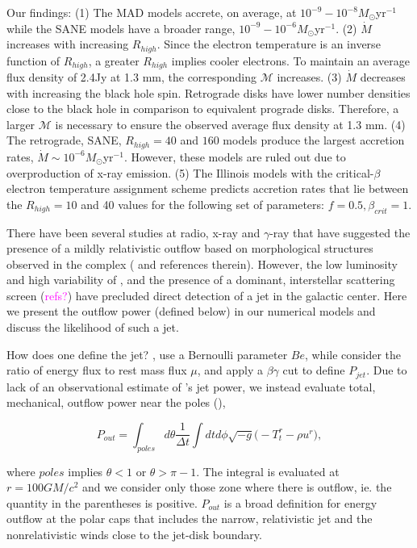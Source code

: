 Our findings: (1) The MAD models accrete, on average, at $10^{-9}-10^{-8} M_{\odot}$yr$^{-1}$ while the SANE models have a broader range, $10^{-9}-10^{-6} M_{\odot}$yr$^{-1}$. (2) $\dot{M}$ increases with increasing $R_{high}$. Since the electron temperature is an inverse function of $R_{high}$, a greater $R_{high}$ implies cooler electrons. To maintain an average flux density of 2.4Jy at 1.3 mm, the corresponding $\mathcal{M}$ increases. (3) $\dot{M}$ decreases with increasing the black hole spin. Retrograde disks have lower number densities close to the black hole in comparison to equivalent prograde disks. Therefore, a larger $\mathcal{M}$ is necessary to ensure the observed average flux density at 1.3 mm. (4) The retrograde, SANE, $R_{high}=40$ and $160$ models produce the largest accretion rates, $\dot{M}\sim 10^{-6}M_{\odot}$yr$^{-1}$. However, these models are ruled out due to overproduction of x-ray emission. (5) The Illinois models with the critical-$\beta$ electron temperature assignment scheme predicts accretion rates that lie between the $R_{high}=10$ and 40 values for the following set of parameters: $f=0.5, \beta_{crit}=1$.

There have been several studies at radio, x-ray and $\gamma$-ray that have suggested the presence of a mildly relativistic outflow  based on morphological structures observed in the \sgra complex (\citealt{2012AAS...22051303S,Li_2013,2019ApJ...875...44Z} and references therein). However, the low luminosity and high variability of \sgra, and the presence of a dominant, interstellar scattering screen (\textcolor{magenta}{refs?}) have precluded direct detection of a jet in the galactic center. Here we present the outflow power (defined below) in our numerical models and discuss the likelihood of such a jet.

How does one define the jet? \citet{refId0}, \citet{2014A&A...570A...7M} use a Bernoulli parameter $Be$, while \citealt{10.1111/j.1365-2966.2012.22002.x} consider the ratio of energy flux to rest mass flux $\mu$, and \citet{M87PaperV} apply a $\beta\gamma$ cut to define $P_{jet}$. Due to lack of an observational estimate of \sgra's jet power, we instead evaluate total, mechanical, outflow power near the poles (\cite{M87PaperV}),

\begin{equation}
    P_{out} = \int_{poles}d\theta\frac{1}{\Delta t}\int dtd\phi\sqrt{-g}\big(-T^{r}_{t}-\rho u^{r}\big),
\end{equation}

where $poles$ implies $\theta<1$ or $\theta>\pi-1$. The integral is evaluated at $r=100GM/c^{2}$ and we consider only those zone where there is outflow, ie. the quantity in the parentheses is positive. $P_{out}$ is a broad definition for energy outflow at the polar caps that includes the narrow, relativistic jet and the nonrelativistic winds close to the jet-disk boundary.

